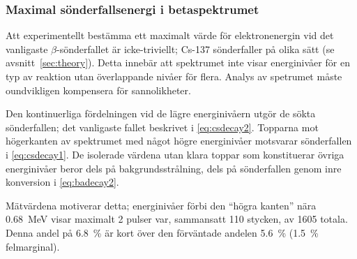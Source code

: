 \subsubsection{Maximal sönderfallsenergi i betaspektrumet} \label{sec:betamax}

Att experimentellt bestämma ett maximalt värde för elektronenergin vid
det vanligaste $\beta$-sönderfallet är icke-triviellt; Cs-137 sönderfaller på
olika sätt (se avsnitt~\ref{sec:theory}). Detta innebär att spektrumet inte
visar energinivåer för en typ av reaktion utan överlappande nivåer för flera.
Analys av spetrumet måste oundvikligen kompensera för sannolikheter.

Den kontinuerliga fördelningen vid de lägre energinivåern utgör de sökta
sönderfallen; det vanligaste fallet beskrivet i \eqref{eq:csdecay2}.
Topparna mot högerkanten av spektrumet med något högre energinivåer motsvarar
sönderfallen i \eqref{eq:csdecay1}. De isolerade värdena utan klara
toppar som konstituerar övriga energinivåer beror dels på
bakgrundsstrålning, dels på sönderfallen genom inre konversion i
\eqref{eq:badecay2}.

Mätvärdena motiverar detta; energinivåer förbi den ``högra kanten'' nära
\qty{0.68}{\MeV} visar maximalt \num{2} pulser var, sammansatt \num{110}
stycken, av \num{1605} totala. Denna andel på \qty{6.8}{\percent} är kort
över den förväntade andelen \qty{5.6}{\percent} (\qty{1.5}{\percent}
felmarginal).

